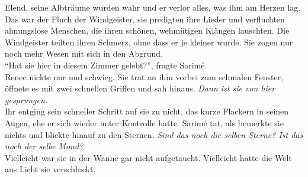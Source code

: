 Elend, seine Albträume wurden wahr und er verlor alles, was ihm am Herzen lag. Das war der Fluch 
der Windgeister, sie predigten ihre Lieder und verfluchten ahnungslose Menschen, die ihren schönen, 
wehmütigen Klängen lauschten. Die Windgeister teilten ihren Schmerz, ohne dass er je kleiner wurde. 
Sie zogen nur noch mehr Wesen mit sich in den Abgrund.\\
``Hat sie hier in diesem Zimmer gelebt?'', fragte Sarimé.\\
Renec nickte nur und schwieg. Sie trat an ihm vorbei zum schmalen Fenster, öffnete es mit zwei 
schnellen Griffen und sah hinaus. \textit{Dann ist sie von hier gesprungen.}\\
Ihr entging sein schneller Schritt auf sie zu nicht, das kurze Flackern in seinen Augen, ehe er 
sich wieder unter Kontrolle hatte. Sarimé tat, als bemerkte sie nichts und blickte hinauf zu den 
Sternen. \textit{Sind das noch die selben Sterne? Ist das noch der selbe Mond?}\\
Vielleicht war sie in der Wanne gar nicht aufgetaucht. Vielleicht hatte die Welt aus Licht sie 
verschluckt.